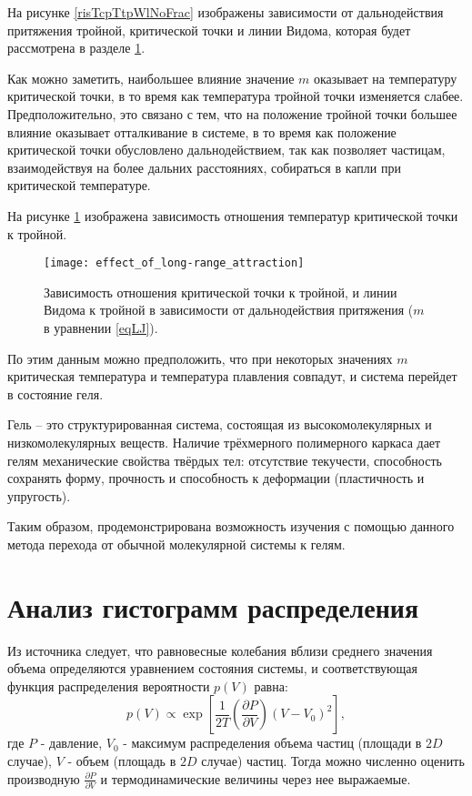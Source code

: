 На рисунке \ref{risTcpTtpWlNoFrac} изображены зависимости от дальнодействия притяжения тройной, критической точки и линии Видома, которая будет рассмотрена в разделе \ref{C2_3}.

Как можно заметить, наибольшее влияние значение $m$ оказывает на температуру критической точки, в то время как температура тройной точки изменяется слабее. Предположительно, это связано с тем, что на положение тройной точки большее влияние оказывает отталкивание в системе, в то время как положение критической точки обусловлено дальнодействием, так как позволяет частицам, взаимодействуя на более дальних расстояниях, собираться в капли при критической температуре.

На рисунке \ref{risTcpTtp} изображена зависимость отношения температур критической точки к тройной.

\begin{figure}[h]
\begin{center}
\texttt{[image: effect\_of\_long-range\_attraction]}
\caption{Зависимость отношения критической точки к тройной, и линии Видома к тройной в зависимости от дальнодействия притяжения ($m$ в уравнении \ref{eqLJ}).}
\label{risTcpTtp}
\end{center}
\end{figure}

По этим данным можно предположить, что при некоторых значениях $m$ критическая температура и температура плавления совпадут, и система перейдет в состояние геля. 

Гель -- это структурированная система, состоящая из высокомолекулярных и низкомолекулярных веществ. Наличие трёхмерного полимерного каркаса дает гелям механические свойства твёрдых тел: отсутствие текучести, способность сохранять форму, прочность и способность к деформации (пластичность и упругость).

Таким образом, продемонстрирована возможность изучения с помощью данного метода перехода от обычной молекулярной системы к гелям. 


\section{Анализ гистограмм распределения}\label{C2_3}

Из источника \cite{Yur54} следует, что равновесные колебания вблизи среднего значения объема определяются уравнением состояния системы, и соответствующая функция распределения вероятности $p(V)$ равна:
\begin{equation}
p(V) \varpropto \exp\left[ \frac{1}{2T} \left( \frac{\partial P}{\partial V} \right)  \left(V - V_0 \right)^2 \right],
\label{eqPv}
\end{equation}
где $P$ - давление, $V_0$ - максимум распределения объема частиц (площади в $2D$ случае), $V$ - объем (площадь в $2D$ случае) частиц.
Тогда можно численно оценить производную $\frac{\partial P}{\partial V}$ и термодинамические величины через нее выражаемые.

